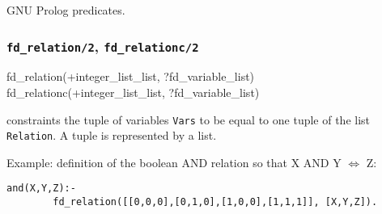 \begin{PlErrors}








\end{PlErrors}

\Portability

GNU Prolog predicates.

\subsubsection{\texttt{fd\_relation/2},
\texttt{fd\_relationc/2}}

\begin{TemplatesOneCol}
fd\_relation(+integer\_list\_list, ?fd\_variable\_list)\\
fd\_relationc(+integer\_list\_list, ?fd\_variable\_list)

\end{TemplatesOneCol}

\Description

 constraints the tuple of variables
\texttt{Vars} to be equal to one tuple of the list \texttt{Relation}. A
tuple is represented by a list.

Example: definition of the boolean AND relation so that X AND Y
$\Leftrightarrow$ Z:

\begin{Indentation}
\begin{verbatim}
and(X,Y,Z):-
        fd_relation([[0,0,0],[0,1,0],[1,0,0],[1,1,1]], [X,Y,Z]).
\end{verbatim}
\end{Indentation}

